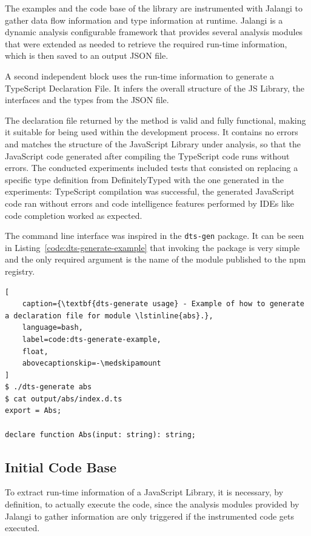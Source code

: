 \documentclass[a4paper,english,cleveref, autoref]{lipics-v2019}
\newcommand{\coderef}[1]{Listing~\ref{#1}}
\begin{document}
The examples and the code base of the library are instrumented with Jalangi \cite{DBLP:conf/sigsoft/SenKBG13}\cite{DBLP:conf/sigsoft/SenKBG13a} to gather data flow information and type information at runtime. Jalangi is a dynamic analysis configurable framework that provides several analysis modules that were extended as needed to retrieve the required run-time information, which is then saved to an output JSON file.

A second independent block uses the run-time information to generate a TypeScript Declaration File. It infers the overall structure of the JS Library, the interfaces and the types from the JSON file.

The declaration file returned by the method is valid and fully functional, making it suitable for being used within the development process. It contains no errors and matches the structure of the JavaScript Library under analysis, so that the JavaScript code generated after compiling the TypeScript code runs without errors. The conducted experiments included tests that consisted on replacing a specific type definition from DefinitelyTyped \cite{definitely-typed-repository} with the one generated in the experiments: TypeScript compilation was successful, the generated JavaScript code ran without errors and code intelligence features performed by IDEs like code completion worked as expected.

The command line interface was inspired in the \lstinline{dts-gen} \cite{dts-gen} package. It can be seen in \coderef{code:dts-generate-example} that invoking the package is very simple and the only required argument is the name of the module published to the npm registry.

\begin{lstlisting}[
    caption={\textbf{dts-generate usage} - Example of how to generate a declaration file for module \lstinline{abs}.},
    language=bash,
	label=code:dts-generate-example,
    float,
    abovecaptionskip=-\medskipamount
]
$ ./dts-generate abs
$ cat output/abs/index.d.ts 
export = Abs;

declare function Abs(input: string): string;
\end{lstlisting}

\subsection{Initial Code Base}
To extract run-time information of a JavaScript Library, it is necessary, by definition, to actually execute the code, since the analysis modules provided by Jalangi to gather information are only triggered if the instrumented code gets executed.
\end{document}
